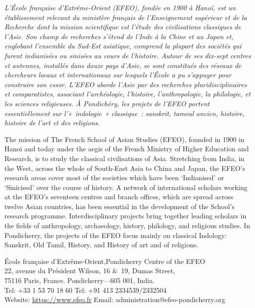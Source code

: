\noindent
\textsl{L'École française d'Extrême-Orient (EFEO), fondée en 1900 à Hanoï, est un établissement relevant du ministère français de l'Enseignement supérieur et de la Recherche dont la mission scientifique est l'étude des civilisations classiques de l'Asie. Son champ de recherches s'étend de l'Inde à la Chine et au Japon et, englobant l'ensemble du Sud-Est asiatique, comprend la plupart des sociétés qui furent indianisées ou sinisées au cours de l'histoire. Autour de ses dix-sept centres et antennes, installés dans douze pays d'Asie, se sont constitués des réseaux de chercheurs locaux et internationaux sur lesquels l'École a pu s'appuyer pour construire son essor. L'EFEO aborde l'Asie par des recherches pluridisciplinaires et comparatistes, associant l'archéologie, l'histoire, l'anthropologie, la philologie, et les sciences religieuses. À Pondichéry, les projets de l'EFEO portent essentiellement sur l'«~indologie~» classique~: sanskrit, tamoul ancien, histoire, histoire de l'art et des religions.}

\medskip
\noindent
The mission of The French School of Asian Studies (EFEO), founded in 1900 in Hanoi and today under the aegis of the French Ministry of Higher Education and Research, is to study the classical civilisations of Asia. Stretching from India, in the West, across the whole of South-East Asia to China and Japan, the EFEO's research areas cover most of the societies which have been `Indianised' or `Sinicised' over the course of history. A network of international scholars working at the EFEO's seventeen centres and branch offices, which are spread across twelve Asian countries, has been essential in the development of the School's research programme. Interdisciplinary projects bring together leading scholars in the fields of anthropology, archaeology, history, philology, and religious studies. In Pondicherry, the projects of the EFEO focus mainly on classical Indology: Sanskrit, Old Tamil, History, and History of art and of religions.

\medskip
\noindent
École française d'Extrême-Orient,\hfill Pondicherry Centre of the EFEO\\
22, avenue du Président Wilson,  \hfill 16 \&\ 19, Dumas Street, \\
75116 Paris, France.             \hfill Pondicherry---605 001, India. \\
Tel: +33 1 53 70 18 60          \hfill Tel: +91 413 2334539/2332504\\
Website: \url{https://www.efeo.fr}    \hfill Email: administration@efeo-pondicherry.org


